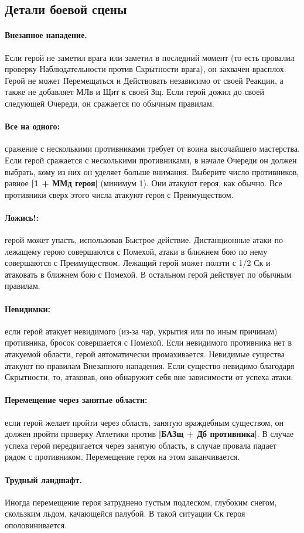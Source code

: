 \subsection{Детали боевой сцены}
\paragraph{Внезапное нападение.} Если герой не заметил врага или заметил в последний момент (то есть провалил проверку Наблюдательности против Скрытности врага), он захвачен врасплох. Герой не может Перемещаться и Действовать независимо от своей Реакции, а также не добавляет МЛв и Щит к своей Зщ. Если герой дожил до своей следующей Очереди, он сражается по обычным правилам.
\paragraph{Все на одного:} сражение с несколькими противниками требует от воина высочайшего мастерства. Если герой сражается с несколькими противниками, в начале Очереди он должен выбрать, кому из них он уделяет больше внимания. Выберите число противников, равное \textbf{|1 + ММд героя|} (минимум 1). Они атакуют героя, как обычно. Все противники сверх этого числа атакуют героя с Преимуществом.
\paragraph{Ложись!:} герой может упасть, использовав Быстрое действие. Дистанционные атаки по лежащему герою совершаются с Помехой, атаки в ближнем бою по нему совершаются с Преимуществом. Лежащий герой может ползти с 1/2 Ск и атаковать в ближнем бою с Помехой. В остальном герой действует по обычным правилам.
\paragraph{Невидимки:} если герой атакует невидимого (из-за чар, укрытия или по иным причинам) противника, бросок совершается с Помехой. Если невидимого противника нет в атакуемой области, герой автоматически промахивается. Невидимые существа атакуют по правилам Внезапного нападения. Если существо невидимо благодаря Скрытности, то, атаковав, оно обнаружит себя вне зависимости от успеха атаки.
\paragraph{Перемещение через занятые области:} если герой желает пройти через область, занятую враждебным существом, он должен пройти проверку Атлетики против \textbf{|БАЗщ + Дб противника|}. В случае успеха герой передвигается через занятую область, в случае провала падает рядом с противником. Перемещение героя на этом заканчивается.
\paragraph{Трудный ландшафт.} Иногда перемещение героя затруднено густым подлеском, глубоким снегом, скользким льдом, качающейся палубой. В такой ситуации Ск героя ополовинивается.
